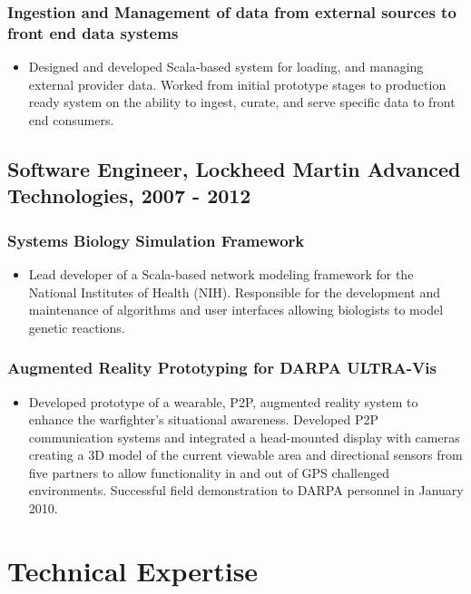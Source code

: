 \documentclass[11pt]{article}
\begin{document}
\subsubsection*{Ingestion and Management of data from external sources to front end data systems}
\label{sec-1-5-1}

\begin{itemize}
\item Designed and developed Scala-based system for loading, and managing external provider data. Worked from initial prototype stages to production ready system on the ability to ingest, curate, and serve specific data to front end consumers.
\end{itemize}

\subsection*{Software Engineer, Lockheed Martin Advanced Technologies, 2007 - 2012}
\label{sec-1-6}
\subsubsection*{Systems Biology Simulation Framework}
\label{sec-1-6-1}

\begin{itemize}
\item Lead developer of a Scala-based network modeling framework for the National Institutes of Health (NIH). Responsible for the development and maintenance of algorithms and user interfaces allowing biologists to model genetic reactions.
\end{itemize}

\subsubsection*{Augmented Reality Prototyping for DARPA ULTRA-Vis}
\label{sec-1-6-3}

\begin{itemize}
\item Developed prototype of a wearable, P2P, augmented reality system to enhance the warfighter's situational awareness. Developed P2P communication systems and integrated a head-mounted display with cameras creating a 3D model of the current viewable area and directional sensors from five partners to allow functionality in and out of GPS challenged environments. Successful field demonstration to DARPA personnel in January 2010.
\end{itemize}
\section*{Technical Expertise}
\label{sec-2}
\end{document}
